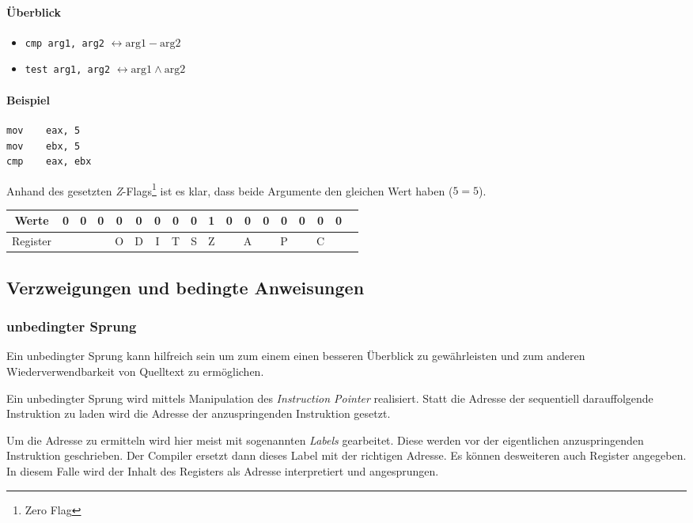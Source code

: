 \paragraph{Überblick}
\begin{itemize}
	\item \texttt{cmp arg1, arg2} $\leftrightarrow \text{arg1} - \text{arg2}$

	\item \texttt{test arg1, arg2} $\leftrightarrow \text{arg1} \wedge \text{arg2}$
\end{itemize}

\paragraph{Beispiel\newline}
\makebox{}
\begin{lstlisting}
mov    eax, 5
mov    ebx, 5
cmp    eax, ebx
\end{lstlisting}

Anhand des gesetzten \textit{Z}-Flags\footnote{Zero Flag} ist es klar, dass beide Argumente den gleichen Wert haben ($5 = 5$). 

\begin{tabular}{|c|c|c|c|c|c|c|c|c|c|c|c|c|c|c|c|c|c|}
\hline Werte & 0 & 0 & 0 & 0 & 0 & 0 & 0 & 0 & 1 & 0 & 0 & 0 & 0 & 0 & 0 & 0 \\
\hline Register & & & & O & D & I & T & S & Z & & A & & P & & C \\
\hline
\end{tabular}

\subsection{Verzweigungen und bedingte Anweisungen}

\subsubsection{unbedingter Sprung}
Ein unbedingter Sprung kann hilfreich sein um zum einem einen besseren Überblick zu gewährleisten und zum anderen Wiederverwendbarkeit von Quelltext zu ermöglichen.

Ein unbedingter Sprung wird mittels Manipulation des \textit{Instruction Pointer} realisiert.
Statt die Adresse der sequentiell darauffolgende Instruktion zu laden wird die Adresse der anzuspringenden Instruktion gesetzt.

Um die Adresse zu ermitteln wird hier meist mit sogenannten \textit{Labels} gearbeitet. Diese werden vor der eigentlichen anzuspringenden Instruktion geschrieben. Der Compiler ersetzt dann dieses Label mit der richtigen Adresse. Es können desweiteren auch Register angegeben. In diesem Falle wird der Inhalt des Registers als Adresse interpretiert und angesprungen.

